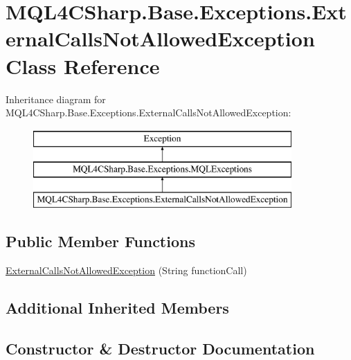 \hypertarget{class_m_q_l4_c_sharp_1_1_base_1_1_exceptions_1_1_external_calls_not_allowed_exception}{}\section{M\+Q\+L4\+C\+Sharp.\+Base.\+Exceptions.\+External\+Calls\+Not\+Allowed\+Exception Class Reference}
\label{class_m_q_l4_c_sharp_1_1_base_1_1_exceptions_1_1_external_calls_not_allowed_exception}
Inheritance diagram for M\+Q\+L4\+C\+Sharp.\+Base.\+Exceptions.\+External\+Calls\+Not\+Allowed\+Exception\+:\begin{figure}[H]
\begin{center}
\leavevmode
\includegraphics[height=3.000000cm]{class_m_q_l4_c_sharp_1_1_base_1_1_exceptions_1_1_external_calls_not_allowed_exception}
\end{center}
\end{figure}
\subsection*{Public Member Functions}
\begin{DoxyCompactItemize}
\item 
\hyperlink{class_m_q_l4_c_sharp_1_1_base_1_1_exceptions_1_1_external_calls_not_allowed_exception_a1fea010b987b987fe8c59b6e3a859d2c}{External\+Calls\+Not\+Allowed\+Exception} (String function\+Call)
\end{DoxyCompactItemize}
\subsection*{Additional Inherited Members}


\subsection{Constructor \& Destructor Documentation}
